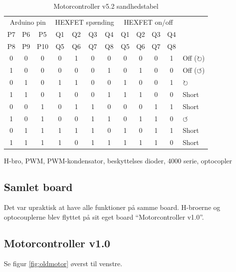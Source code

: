 \documentclass[a4paper,11pt,oneside,article,danish,table]{memoir}
\newcommand{\boarddate}[1]{\marginpar{\tiny\textcolor{blue!80!black}{#1}}}
\begin{document}
\begin{table}[htbp]
  \caption{Motorcontroller v5.2 sandhedstabel}
  \centering
  \begin{tabular}{ccc|cccc|ccccl}
    \toprule
    \multicolumn{3}{c}{Arduino pin}&\multicolumn{4}{c}{HEXFET spænding}&\multicolumn{4}{c}{HEXFET on/off}\\
    P7&P6&P5 &Q1&Q2&Q3&Q4 &Q1&Q2&Q3&Q4\\
    P8&P9&P10 &Q5&Q6&Q7&Q8 &Q5&Q6&Q7&Q8\\
    \midrule
    0&0&0 &0&1&0&0 &0&0&0&1 & Off ($\circlearrowright$)\\
    1&0&0 &0&0&0&1 &0&1&0&0 & Off ($\circlearrowleft$)\\
    0&1&0 &1&1&0&0 &1&0&0&1 & $\circlearrowright$\\
    1&1&0 &1&0&0&1 &1&1&0&0 & Short\\
    0&0&1 &0&1&1&0 &0&0&1&1 & Short\\
    1&0&1 &0&0&1&1 &0&1&1&0 & $\circlearrowleft$\\
    0&1&1 &1&1&1&0 &1&0&1&1 & Short\\
    1&1&1 &1&0&1&1 &1&1&1&0 & Short\\
    \bottomrule
  \end{tabular}
  \label{tab:sandhed}
\end{table}

H-bro, PWM, PWM-kondensator, beskyttelses dioder, 4000 serie, optocopler

\subsection{Samlet board}
Det var upraktisk at have alle funktioner på samme board. H-broerne og optocouplerne blev flyttet på sit eget board “Motorcontroller v1.0”.

\subsection{Motorcontroller v1.0}
\boarddate{24. januar 2012}
Se figur \ref{fig:oldmotor} øverst til venstre.
\end{document}
